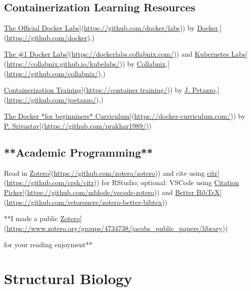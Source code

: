 \documentclass[
]{book}
\begin{document}
\section{Containerization Learning Resources}\label{containerization-learning-resources}

\href{\%5Bhttps://github.com/docker/labs}{The Official Docker Labs}{]}(\url{https://github.com/docker/labs})) by \href{\%5Bhttps://github.com/docker}{Docker},{]}(\url{https://github.com/docker}),)

\href{\%5Bhttps://dockerlabs.collabnix.com/}{The \#1 Docker Labs}{]}(\url{https://dockerlabs.collabnix.com/})) and \href{\%5Bhttps://collabnix.github.io/kubelabs/}{Kubernetes Labs}{]}(\url{https://collabnix.github.io/kubelabs/})) by \href{\%5Bhttps://github.com/collabnix/}{Collabnix},{]}(\url{https://github.com/collabnix/}),)

\href{\%5Bhttps://container.training/}{Containerization Training}{]}(\url{https://container.training/})) by \href{\%5Bhttps://github.com/jpetazzo/}{J. Petazzo},{]}(\url{https://github.com/jpetazzo/}),)

\href{\%5Bhttps://docker-curriculum.com/}{The Docker *for beginniners* Curriculum}{]}(\url{https://docker-curriculum.com/})) by \href{\%5Bhttps://github.com/prakhar1989/}{P. Srivastav}{]}(\url{https://github.com/prakhar1989/}))

\section{**Academic Programming**}\label{academic-programming}

Read in \href{\%5Bhttps://github.com/zotero/zotero}{Zotero}{]}(\url{https://github.com/zotero/zotero})) and cite using \href{\%5Bhttps://github.com/crsh/citr}{citr}{]}(\url{https://github.com/crsh/citr})) for RStudio; optional: VSCode using \href{\%5Bhttps://github.com/mblode/vscode-zotero}{Citation Picker}{]}(\url{https://github.com/mblode/vscode-zotero})) and \href{\%5Bhttps://github.com/retorquere/zotero-better-bibtex}{Better BibTeX}{]}(\url{https://github.com/retorquere/zotero-better-bibtex}))

**I made a public \href{\%5Bhttps://www.zotero.org/groups/4734738/jacobs_public_papers/library}{Zotero}{]}(\url{https://www.zotero.org/groups/4734738/jacobs_public_papers/library}))

for your reading enjoyment**

\chapter{Structural Biology}\label{structural-biology}
\end{document}
